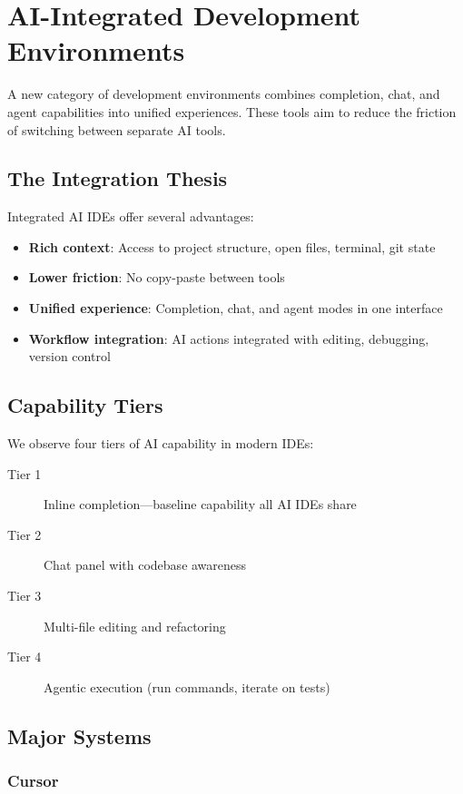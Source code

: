 \section{AI-Integrated Development Environments}
\label{sec:ide}

A new category of development environments combines completion, chat, and agent capabilities into unified experiences. These tools aim to reduce the friction of switching between separate AI tools.

\subsection{The Integration Thesis}

Integrated AI IDEs offer several advantages:
\begin{itemize}
    \item \textbf{Rich context}: Access to project structure, open files, terminal, git state
    \item \textbf{Lower friction}: No copy-paste between tools
    \item \textbf{Unified experience}: Completion, chat, and agent modes in one interface
    \item \textbf{Workflow integration}: AI actions integrated with editing, debugging, version control
\end{itemize}

\subsection{Capability Tiers}

We observe four tiers of AI capability in modern IDEs:

\begin{description}
    \item[Tier 1] Inline completion---baseline capability all AI IDEs share
    \item[Tier 2] Chat panel with codebase awareness
    \item[Tier 3] Multi-file editing and refactoring
    \item[Tier 4] Agentic execution (run commands, iterate on tests)
\end{description}

\subsection{Major Systems}

\subsubsection{Cursor}

